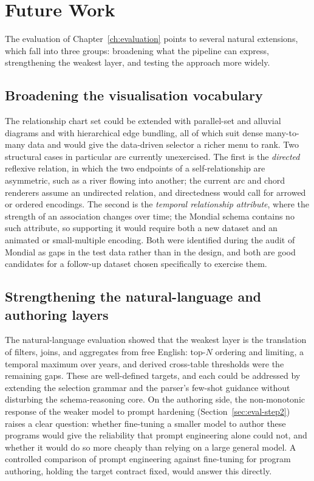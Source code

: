 \chapter{Future Work}
\label{ch:future}

The evaluation of Chapter~\ref{ch:evaluation} points to several natural extensions, which fall into three groups: broadening what the pipeline can express, strengthening the weakest layer, and testing the approach more widely.

\section{Broadening the visualisation vocabulary}

The relationship chart set could be extended with parallel-set and alluvial diagrams and with hierarchical edge bundling, all of which suit dense many-to-many data and would give the data-driven selector a richer menu to rank. Two structural cases in particular are currently unexercised. The first is the \emph{directed} reflexive relation, in which the two endpoints of a self-relationship are asymmetric, such as a river flowing into another; the current arc and chord renderers assume an undirected relation, and directedness would call for arrowed or ordered encodings. The second is the \emph{temporal relationship attribute}, where the strength of an association changes over time; the Mondial schema contains no such attribute, so supporting it would require both a new dataset and an animated or small-multiple encoding. Both were identified during the audit of Mondial as gaps in the test data rather than in the design, and both are good candidates for a follow-up dataset chosen specifically to exercise them.

\section{Strengthening the natural-language and authoring layers}

The natural-language evaluation showed that the weakest layer is the translation of filters, joins, and aggregates from free English: top-$N$ ordering and limiting, a temporal maximum over years, and derived cross-table thresholds were the remaining gaps. These are well-defined targets, and each could be addressed by extending the selection grammar and the parser's few-shot guidance without disturbing the schema-reasoning core. On the authoring side, the non-monotonic response of the weaker model to prompt hardening (Section~\ref{sec:eval-step2}) raises a clear question: whether fine-tuning a smaller model to author these programs would give the reliability that prompt engineering alone could not, and whether it would do so more cheaply than relying on a large general model. A controlled comparison of prompt engineering against fine-tuning for program authoring, holding the target contract fixed, would answer this directly.

